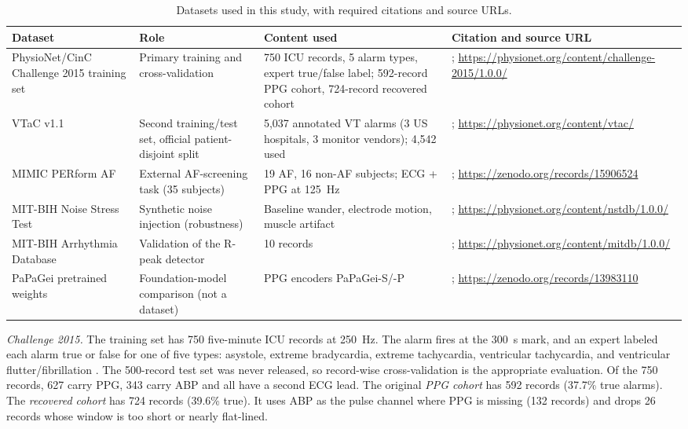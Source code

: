 \documentclass[conference]{IEEEtran}
\begin{document}
\begin{table}[t]
\caption{Datasets used in this study, with required citations and source URLs.}
\label{tab:datasets}
\centering
\small
\begin{tabular}{p{2.6cm}p{3.7cm}p{3.7cm}p{6.3cm}}
\toprule
\textbf{Dataset} & \textbf{Role} & \textbf{Content used} & \textbf{Citation and source URL}\\
\midrule
PhysioNet/CinC Challenge 2015 training set & Primary training and cross-validation & 750 ICU records, 5 alarm types, expert true/false label; 592-record PPG cohort, 724-record recovered cohort & \cite{clifford2015challenge,clifford2015cincdata}; \url{https://physionet.org/content/challenge-2015/1.0.0/}\\
VTaC v1.1 & Second training/test set, official patient-disjoint split & 5,037 annotated VT alarms (3 US hospitals, 3 monitor vendors); 4,542 used & \cite{lehman2023vtac,lehman2024vtacdata}; \url{https://physionet.org/content/vtac/}\\
MIMIC PERform AF & External AF-screening task (35 subjects) & 19 AF, 16 non-AF subjects; ECG + PPG at 125~Hz & \cite{charlton2025perform,charlton2022beats}; \url{https://zenodo.org/records/15906524}\\
MIT-BIH Noise Stress Test & Synthetic noise injection (robustness) & Baseline wander, electrode motion, muscle artifact & \cite{moody1984nstdb}; \url{https://physionet.org/content/nstdb/1.0.0/}\\
MIT-BIH Arrhythmia Database & Validation of the R-peak detector & 10 records & \cite{moody2001mitbih}; \url{https://physionet.org/content/mitdb/1.0.0/}\\
PaPaGei pretrained weights & Foundation-model comparison (not a dataset) & PPG encoders PaPaGei-S/-P & \cite{pillai2025papagei}; \url{https://zenodo.org/records/13983110}\\
\bottomrule
\end{tabular}
\end{table}

\emph{Challenge 2015.} The training set has 750 five-minute ICU records at 250~Hz. The alarm fires at the 300~s mark, and an expert labeled each alarm true or false for one of five types: asystole, extreme bradycardia, extreme tachycardia, ventricular tachycardia, and ventricular flutter/fibrillation \cite{clifford2015challenge,clifford2016false}. The 500-record test set was never released, so record-wise cross-validation is the appropriate evaluation. Of the 750 records, 627 carry PPG, 343 carry ABP and all have a second ECG lead. The original \emph{PPG cohort} has 592 records (37.7\% true alarms). The \emph{recovered cohort} has 724 records (39.6\% true). It uses ABP as the pulse channel where PPG is missing (132 records) and drops 26 records whose window is too short or nearly flat-lined.
\end{document}
